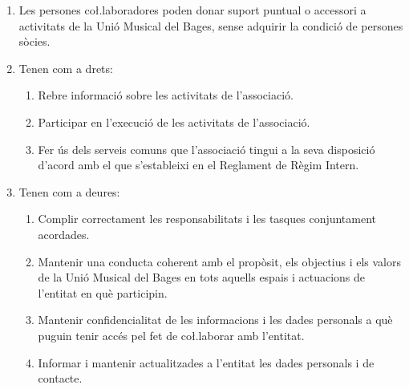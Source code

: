 \documentclass[11pt,a4paper]{article}
\newcommand{\UMB}{Unió Musical del Bages\xspace}
\DeclareRobustCommand{\RRI}{Reglament de Règim Intern\xspace}
\begin{document}

\begin{enumerate}

    \item Les persones co\l.laboradores poden donar suport puntual o accessori a activitats de la \UMB, sense adquirir la condició de persones sòcies.
    \item Tenen com a drets:
    \begin{enumerate}
        \item Rebre informació sobre les activitats de l'associació.
        \item Participar en l'execució de les activitats de l'associació.
        \item Fer ús dels serveis comuns que l'associació tingui a la seva disposició d'acord amb el que s'estableixi en el \RRI.
    \end{enumerate}

    \item Tenen com a deures:
    \begin{enumerate}
        \item Complir correctament les responsabilitats i les tasques conjuntament acordades.
        \item Mantenir una conducta coherent amb el propòsit, els objectius i els valors de la \UMB en tots aquells espais i actuacions de l'entitat en què participin.
        \item Mantenir confidencialitat de les informacions i les dades personals a què puguin tenir accés pel fet de co\l.laborar amb l'entitat.
        \item Informar i mantenir actualitzades a l'entitat les dades personals i de contacte.
    \end{enumerate}

\end{enumerate}
\end{document}
